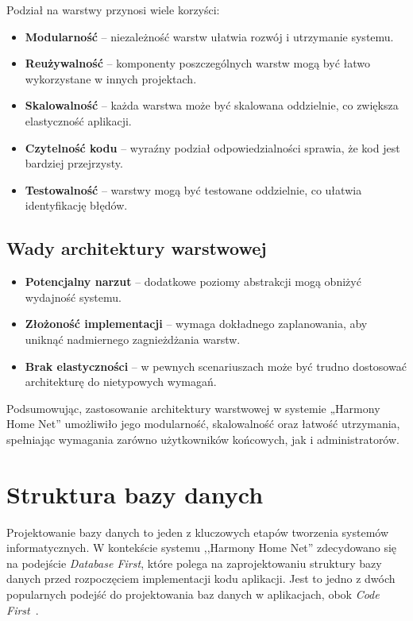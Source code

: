 Podział na warstwy przynosi wiele korzyści:
\begin{itemize}
    \item \textbf{Modularność} -- niezależność warstw ułatwia rozwój i utrzymanie systemu.
    \item \textbf{Reużywalność} -- komponenty poszczególnych warstw mogą być łatwo wykorzystane w innych projektach.
    \item \textbf{Skalowalność} -- każda warstwa może być skalowana oddzielnie, co zwiększa elastyczność aplikacji.
    \item \textbf{Czytelność kodu} -- wyraźny podział odpowiedzialności sprawia, że kod jest bardziej przejrzysty.
    \item \textbf{Testowalność} -- warstwy mogą być testowane oddzielnie, co ułatwia identyfikację błędów.
\end{itemize}

\subsection{Wady architektury warstwowej}

\begin{itemize}
    \item \textbf{Potencjalny narzut} -- dodatkowe poziomy abstrakcji mogą obniżyć wydajność systemu.
    \item \textbf{Złożoność implementacji} -- wymaga dokładnego zaplanowania, aby uniknąć nadmiernego zagnieżdżania warstw.
    \item \textbf{Brak elastyczności} -- w pewnych scenariuszach może być trudno dostosować architekturę do nietypowych wymagań.
\end{itemize}

\noindent Podsumowując, zastosowanie architektury warstwowej w systemie „Harmony Home Net” umożliwiło jego modularność, skalowalność oraz łatwość utrzymania, spełniając wymagania zarówno użytkowników końcowych, jak i administratorów.

\section{Struktura bazy danych}

Projektowanie bazy danych to jeden z kluczowych etapów tworzenia systemów informatycznych. W kontekście systemu ,,Harmony Home Net'' zdecydowano się na podejście \emph{Database First}, które polega na zaprojektowaniu struktury bazy danych przed rozpoczęciem implementacji kodu aplikacji. Jest to jedno z dwóch popularnych podejść do projektowania baz danych w aplikacjach, obok \emph{Code First}~\cite{DB_FIRST_VS_CODE_FIRST_1,DB_FIRST_VS_CODE_FIRST_2}.

